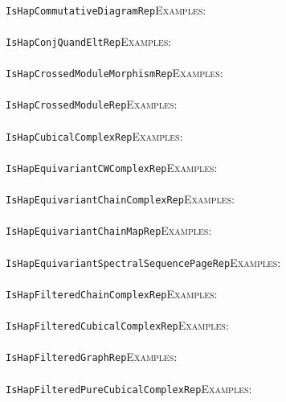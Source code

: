 \documentclass[a4paper,11pt]{report}
\begin{document}
{{ \\
 \texttt{IsHapCommutativeDiagramRep}{\nobreakspace}{\nobreakspace}{\nobreakspace}{\nobreakspace}\textsc{Examples:} \\
 \\
 \texttt{IsHapConjQuandEltRep}{\nobreakspace}{\nobreakspace}{\nobreakspace}{\nobreakspace}\textsc{Examples:} \\
 \\
 \texttt{IsHapCrossedModuleMorphismRep}{\nobreakspace}{\nobreakspace}{\nobreakspace}{\nobreakspace}\textsc{Examples:} \\
 \\
 \texttt{IsHapCrossedModuleRep}{\nobreakspace}{\nobreakspace}{\nobreakspace}{\nobreakspace}\textsc{Examples:} \\
 \\
 \texttt{IsHapCubicalComplexRep}{\nobreakspace}{\nobreakspace}{\nobreakspace}{\nobreakspace}\textsc{Examples:} \\
 \\
 \texttt{IsHapEquivariantCWComplexRep}{\nobreakspace}{\nobreakspace}{\nobreakspace}{\nobreakspace}\textsc{Examples:} \\
 \\
 \texttt{IsHapEquivariantChainComplexRep}{\nobreakspace}{\nobreakspace}{\nobreakspace}{\nobreakspace}\textsc{Examples:} \\
 \\
 \texttt{IsHapEquivariantChainMapRep}{\nobreakspace}{\nobreakspace}{\nobreakspace}{\nobreakspace}\textsc{Examples:} \\
 \\
 \texttt{IsHapEquivariantSpectralSequencePageRep}{\nobreakspace}{\nobreakspace}{\nobreakspace}{\nobreakspace}\textsc{Examples:} \\
 \\
 \texttt{IsHapFilteredChainComplexRep}{\nobreakspace}{\nobreakspace}{\nobreakspace}{\nobreakspace}\textsc{Examples:} \\
 \\
 \texttt{IsHapFilteredCubicalComplexRep}{\nobreakspace}{\nobreakspace}{\nobreakspace}{\nobreakspace}\textsc{Examples:} \\
 \\
 \texttt{IsHapFilteredGraphRep}{\nobreakspace}{\nobreakspace}{\nobreakspace}{\nobreakspace}\textsc{Examples:} \\
 \\
 \texttt{IsHapFilteredPureCubicalComplexRep}{\nobreakspace}{\nobreakspace}{\nobreakspace}{\nobreakspace}\textsc{Examples:} \\
}}
\end{document}
